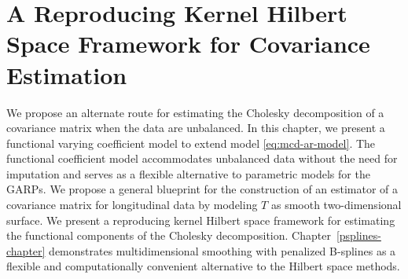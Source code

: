

\chapter{A Reproducing Kernel Hilbert Space Framework for Covariance Estimation} \label{SSANOVA-chapter}


We propose an alternate route for estimating the Cholesky decomposition of a covariance matrix when the data are unbalanced. In this chapter, we present a functional varying coefficient model to extend model \eqref{eq:mcd-ar-model}. The functional coefficient model accommodates unbalanced data without the need for imputation and serves as a flexible alternative to parametric models for the GARPs. We propose a general blueprint for the construction of an estimator of a covariance matrix for longitudinal data by modeling $T$ as smooth two-dimensional surface. We present a reproducing kernel Hilbert space framework for estimating the functional components of the Cholesky decomposition. Chapter~\ref{psplines-chapter} demonstrates multidimensional smoothing with penalized B-splines as a flexible and computationally convenient alternative to the Hilbert space methods.

\bigskip
%
%
%

